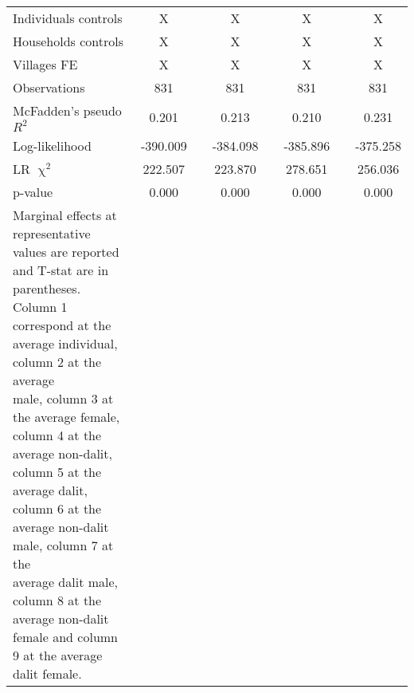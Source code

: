 \begin{table}[htbp]
{\begin{tabular}{lcccccccccccc}
\cmidrule{1-2}\cmidrule{4-5}\cmidrule{7-8}\cmidrule{10-13}  
    Individuals controls & X     &       & \multicolumn{2}{c}{X} &       & \multicolumn{2}{c}{X} &       & \multicolumn{4}{c}{X} \\
    Households controls & X     &       & \multicolumn{2}{c}{X} &       & \multicolumn{2}{c}{X} &       & \multicolumn{4}{c}{X} \\
    Villages FE & X     &       & \multicolumn{2}{c}{X} &       & \multicolumn{2}{c}{X} &       & \multicolumn{4}{c}{X} \\
    \midrule
    Observations & 831   &       & \multicolumn{2}{c}{831} &       & \multicolumn{2}{c}{831} &       & \multicolumn{4}{c}{831} \\
    McFadden's pseudo $R^2$ & 0.201 &       & \multicolumn{2}{c}{0.213} &       & \multicolumn{2}{c}{0.210} &       & \multicolumn{4}{c}{0.231} \\
    Log-likelihood & -390.009 &       & \multicolumn{2}{c}{-384.098} &       & \multicolumn{2}{c}{-385.896} &       & \multicolumn{4}{c}{-375.258} \\
    LR $\upchi^2$ & 222.507 &       & \multicolumn{2}{c}{223.870} &       & \multicolumn{2}{c}{278.651} &       & \multicolumn{4}{c}{256.036} \\
    p-value & 0.000 &       & \multicolumn{2}{c}{0.000} &       & \multicolumn{2}{c}{0.000} &       & \multicolumn{4}{c}{0.000} \\
    \bottomrule
	\Tablenote{13}{
	Marginal effects at representative values are reported and T-stat are in parentheses. Column 1 correspond at the average individual, column 2 at the average \\ 
	male, column 3 at the average female, column 4 at the average non-dalit, column 5 at the average dalit, column 6 at the average non-dalit male, column 7 at the \\ 
	average dalit male, column 8 at the average non-dalit female and column 9 at the average dalit female.} \\
    \end{tabular}%
	}
  \label{tab:ame_indebt}%
\end{table}%
